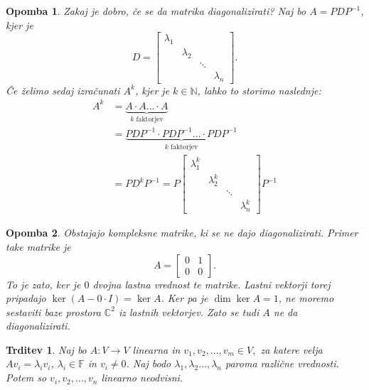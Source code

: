 \documentclass[10pt, a4paper]{article}
\newtheorem{trditev}[izr]{Trditev}
\newtheorem*{opomba}{Opomba}
\newcommand{\N}{\mathbb {N}}
\newcommand{\C}{\mathbb {C}}
\newcommand{\F}{\mathbb {F}}
\begin{document}
\begin{opomba}
    Zakaj je dobro, če se da matrika diagonalizirati?
    Naj bo $A = PDP^{-1}$, kjer je $$D = \begin{bmatrix}
        \lambda_1 & & &\\
         & \lambda_2 & & \\
         & & \ddots & \\
         & & & \lambda_n
    \end{bmatrix}.$$
    Če želimo sedaj izračunati $A^k$, kjer je $k \in \N$, lahko to storimo naslednje:
    \begin{align*}
        A^k &= \underbrace{A \cdot A \dots \cdot A}_{\text{$k$ faktorjev}}\\
        &= \underbrace{PDP^{-1} \cdot PDP^{-1} \dots \cdot PDP^{-1}}_{\text{$k$ faktorjev}}\\
        &= PD^k P^{-1} = P \begin{bmatrix}
            \lambda_1^k & & &\\
         & \lambda_2^k & & \\
         & & \ddots & \\
         & & & \lambda_n^k
        \end{bmatrix} P^{-1}
    \end{align*}
\end{opomba}

\begin{opomba}
    Obstajajo kompleksne matrike, ki se ne dajo diagonalizirati.
    Primer take matrike je $$A = \begin{bmatrix}
        0 & 1\\
        0 & 0
    \end{bmatrix}.$$
    To je zato, ker je $0$ dvojna lastna vrednost te matrike.
    Lastni vektorji torej pripadajo $\ker (A - 0 \cdot I) = \ker A$.
    Ker pa je $\dim \ker A = 1$, ne moremo sestaviti baze prostora $\C^{2}$ iz lastnih vektorjev.
    Zato se tudi $A$ ne da diagonalizirati.
\end{opomba}

\begin{trditev}
    Naj bo $A: V \rightarrow V$ linearna in $v_1, v_2, \dots, v_m \in V,$ za katere velja $A v_i = \lambda_i v_i$, $\lambda_i \in \F$ in $v_i \neq 0$.
    Naj bodo $\lambda_1, \lambda_2 \dots, \lambda_n$ paroma različne vrednosti.
    Potem so $v_i, v_2, \dots, v_n$ linearno neodvisni.
\end{trditev}
\end{document}
